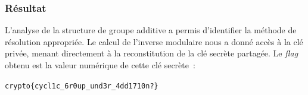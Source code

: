     \subsubsection{Résultat}
    L'analyse de la structure de groupe additive a permis d'identifier la
    méthode de résolution appropriée. Le calcul de l'inverse modulaire nous a
    donné accès à la clé privée, menant directement à la reconstitution de la
    clé secrète partagée. Le \textit{flag} obtenu est la valeur numérique de
    cette clé secrète~:

    \begin{center}
        \texttt{crypto\{cycl1c\_6r0up\_und3r\_4dd1710n?\}}
    \end{center}

